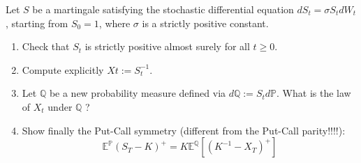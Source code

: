 \documentclass[12pt,a4paper]{exam}
\begin{document}
\begin{questions}
\begin{solution}
\begin{solution}
\question Let $S$ be a martingale satisfying the stochastic differential equation $dS_t = \sigma S_t dW_t$, starting from $S_0 = 1$,
where $\sigma$ is a strictly positive constant.
\begin{enumerate}[label=(\alph*),font=\itshape]
\item Check that $S_t$ is strictly positive almost surely for all $t \geq 0$.
\item Compute explicitly $Xt := S_t^{-1}$.
\item Let $\mathbb{Q}$ be a new probability measure defined via $d\mathbb{Q} := S_t d\mathbb{P}$. What is the law of $X_t$ under $\mathbb{Q}$ ? 
\item Show finally the Put-Call symmetry (different from the Put-Call parity!!!!):
\begin{equation*}
\mathbb{E}^{\mathbb{P}}(S_T-K)^+ = K\mathbb{E}^{\mathbb{Q}}\left[(K^{-1}-X_T)^+\right]
\end{equation*}
\end{enumerate}
\fillwithlines{3cm}


\end{solution}
\end{solution}
\end{questions}
\end{document}
